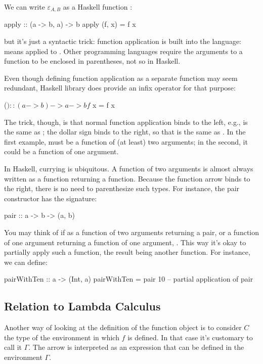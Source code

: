 \documentclass[DaoFP]{subfiles}
\begin{document}
We can write $\varepsilon_{A, B}$ as a Haskell function :
\begin{haskell}
apply :: (a -> b, a) -> b
apply (f, x) = f x
\end{haskell}
but it's just a syntactic trick: function application is built into the language:  means  applied to . Other programming languages require the arguments to a function to be enclosed in parentheses, not so in Haskell. 

Even though defining function application as a separate function may seem redundant, Haskell library does provide an infix operator \hask{$} for that purpose:
\begin{haskell}
($) :: (a -> b) -> a -> b
f $ x = f x
\end{haskell}
The trick, though, is that normal function application binds to the left, e.g.,  is the same as ; the dollar sign binds to the right, so that  is the same as . In the first example,  must be a function of (at least) two arguments; in the second, it could be a function of one argument.

In Haskell, currying is ubiquitous. A function of two arguments is almost always written as a function returning a function. Because the function arrow \hask{->} binds to the right, there is no need to parenthesize such types. For instance, the pair constructor has the signature:
\begin{haskell}
pair :: a -> b -> (a, b)
\end{haskell}
You may think of if as a function of two arguments returning a pair, or a function of one argument returning a function of one argument, . This way it's okay to partially apply such a function, the result being another function. For instance, we can define:
\begin{haskell}
pairWithTen :: a -> (Int, a)
pairWithTen = pair 10 -- partial application of pair
\end{haskell}



\subsection{Relation to Lambda Calculus}

Another way of looking at the definition of the function object is to consider $C$ the type of the environment in which $f$ is defined. In that case it's customary to call it $\Gamma$. The arrow is interpreted as an expression that can be defined in the environment $\Gamma$. 
\end{document}

